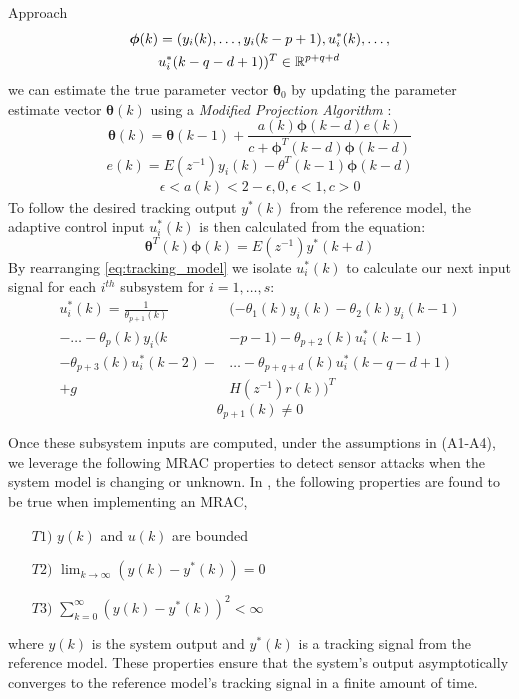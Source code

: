 \begin{section}{Approach}
	\begin{align}
	\begin{split}
	\bm{\phi}(k)&=(y_i(k), \dots ,y_i(k-p+1),u^*_i(k), \dots , \\
	& u^*_i(k-q-d+1))^T \in \mathbb{R}^{p+q+d}
	\end{split}
	\end{align}
we can estimate the true parameter vector $\bm{\theta}_0$ by updating the parameter estimate vector $\bm{\theta}(k)$ using a \textit{Modified Projection Algorithm} \cite{tao2003adaptive}:
	\begin{equation}
	\label{eq:Modified_Proj_Algorithm}
	\bm{\theta}(k)=\bm{\theta}(k-1)+\frac{a(k)\bm{\phi}(k-d)e(k)}{c+\bm{\phi}^T(k-d)\bm{\phi}(k-d)}
	\end{equation}
	\begin{equation}
	e(k)=E(z^{-1})y_i(k)-\theta^T(k-1)\bm{\phi}(k-d)
	\end{equation}
	\begin{align*}
	\epsilon<a(k)<2-\epsilon, 0,\epsilon<1, c>0
	\end{align*}
To follow the desired tracking output $y^*(k)$ from the reference model, the adaptive control input $u^*_i(k)$ is then calculated from the equation:
    \begin{equation}
    \label{eq:tracking_model}
	\bm{\theta}^T(k)\bm{\phi}(k)=E(z^{-1})y^*(k+d)
	\end{equation}
By rearranging \eqref{eq:tracking_model} we isolate $u^*_i(k)$ to calculate our next input signal for each $i^{th}$ subsystem for $i=1,\dots,s$:
	\begin{align}
	\label{eq:End}
	u^*_i(k)=\frac{1}{\theta_{p+1}(k)}&(-\theta_1(k)y_i(k)-\theta_2(k)y_i(k-1)  \nonumber \\
    -\dots-\theta_p(k)y_i(k&-p-1)-\theta_{p+2}(k)u^*_i(k-1)  \\
	-\theta_{p+3}(k)u^*_i(k-2)-& \dots - \theta_{p+q+d}(k)u^*_i(k-q-d+1) \nonumber \\
	+g&H(z^{-1})r(k))^T \nonumber
	\end{align}
    \begin{equation}
	\theta_{p+1}(k)\neq0 \nonumber
	\end{equation}

Once these subsystem inputs are computed, under the assumptions in (A1-A4), we leverage the following MRAC properties to detect sensor attacks when the system model is changing or unknown. In \cite{tao2003adaptive}, the following properties are found to be true when implementing an MRAC,
	\begin{enumerate}[label=(\roman*),leftmargin=4\parindent]
	\label{assumtions_ensure}
	\item[$T1)$] $y(k)$ and $u(k)$ are bounded 
	\item[$T2)$] $\lim_{k\to\infty}(y(k)-y^*(k))=0$
	\label{Truth2}
	\item[$T3)$] $\sum_{k=0}^\infty(y(k)-y^*(k))^2<\infty$
	\end{enumerate}
where $y(k)$ is the system output and $y^*(k)$ is a tracking signal from the reference model. These properties ensure that the system's output asymptotically converges to the reference model's tracking signal in a finite amount of time. 



\end{section}
